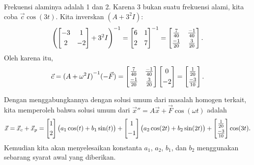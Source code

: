 \begin{example}
Frekuensi alaminya adalah 1 dan 2.  Karena 3 bukan suatu
frekuensi alami, kita coba $\vec{c} \cos (3t)$.
Kita inverskan $(A+3^2 I)$:
\begin{equation*}
{\left( \begin{bmatrix}
-3 & 1 \\
\noalign{\smallskip}
2 & -2
\end{bmatrix}
+3^2 I\right)}^{-1}
=
{\begin{bmatrix}
6 & 1 \\
\noalign{\smallskip}
2 & 7
\end{bmatrix}}^{-1}
=
\begin{bmatrix}
\frac{7}{40} & \frac{-1}{40} \\
\noalign{\smallskip}
\frac{-1}{20} & \frac{3}{20}
\end{bmatrix} .
\end{equation*}
Oleh karena itu,
\begin{equation*}
\vec{c} = 
{(A +\omega^2 I)}^{-1}
(-\vec{F} ) = 
\begin{bmatrix}
\frac{7}{40} & \frac{-1}{40} \\
\noalign{\smallskip}
\frac{-1}{20} & \frac{3}{20}
\end{bmatrix}
\begin{bmatrix}
0 \\
\noalign{\smallskip}
-2
\end{bmatrix}
=
\begin{bmatrix}
\frac{1}{20} \\
\noalign{\smallskip}
\frac{-3}{10}
\end{bmatrix} .
\end{equation*}

Dengan menggabungkannya dengan solusi umum dari masalah
homogen terkait, kita memperoleh bahwa solusi umum dari
${\vec{x}}'' = A \vec{x} + \vec{F} \cos (\omega t)$ adalah
\begin{equation*}
\vec{x}
= \vec{x}_c + \vec{x}_p
=
\begin{bmatrix} 1 \\
\noalign{\smallskip}
2 \end{bmatrix}
\bigl( a_1 \cos (t) + b_1 \sin (t) \bigr)
+
\begin{bmatrix} 1 \\
\noalign{\smallskip}
-1 \end{bmatrix}
\bigl( a_2 \cos (2t) + b_2 \sin (2t) \bigr)
+
\begin{bmatrix}
\frac{1}{20} \\
\noalign{\smallskip}
\frac{-3}{10}
\end{bmatrix}
\cos (3t) .
\end{equation*}
Kemudian kita akan menyelesaikan konstanta
$a_1$, $a_2$, $b_1$, dan $b_2$ menggunakan
sebarang syarat awal yang diberikan.
\end{example}

